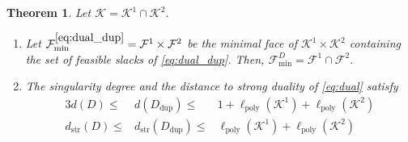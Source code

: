 \documentclass{article}
\newcommand{\minFaceD}{ {\mathcal{F}_{\min}^D}}
\newcommand{\minFace}[1]{ {\mathcal{F}_{\min}^{#1}}}
\newcommand{\stdCone}{ {\mathcal{K}}}
\newcommand{\stdFace}{ \mathcal{F}}
\newcommand{\distP}{\ell _{\text{poly}}}
\newcommand{\distS}{d _{\text{str}}}
\newtheorem{theorem}[definition]{Theorem}
\begin{document}
\begin{theorem}\label{theo:inter_sing}
Let $\stdCone = \stdCone^1 \cap \stdCone^2$. 
\begin{enumerate}[label=(\roman*)]
	\item Let $\minFace{\eqref{eq:dual_dup}} = \stdFace^1 \times \stdFace^2$ be 
the minimal face of $\stdCone^1 \times \stdCone^2$ containing the set of  feasible 
slacks of \eqref{eq:dual_dup}. Then, $\minFaceD = \stdFace ^1 \cap \stdFace ^2 $.
	\item The singularity degree and the distance to strong duality of  \eqref{eq:dual} satisfy
	\begin{alignat*}{3}
		d(D) \leq & d(D_{\text{dup}}) \leq & 1+ \distP(\stdCone^1) + \distP(\stdCone^2)\\
		\distS(D) \leq & \distS(D_{\text{dup}}) \leq & \distP(\stdCone^1) + \distP(\stdCone^2)
	\end{alignat*}
\end{enumerate}
\end{theorem}
\end{document}
